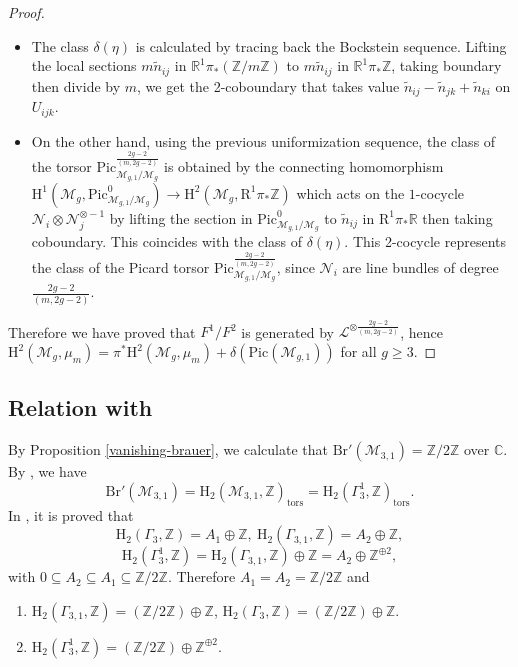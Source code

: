 \documentclass[12pt]{amsart}
\begin{document}
\begin{proof}
\begin{itemize}
\item The class $\delta(\eta)$ is calculated by tracing back the Bockstein sequence. Lifting the local sections $m\widetilde{n}_{ij}$ in $\mathbb{R}^1\pi_*(\mathbb{Z}/m\mathbb{Z})$ to $m\widetilde{n}_{ij}$ in $\mathbb{R}^1\pi_*\mathbb{Z}$, taking boundary then divide by $m$, we get the 2-coboundary that takes value $\widetilde{n}_{ij}-\widetilde{n}_{jk}+\widetilde{n}_{ki}$ on $U_{ijk}$.
\item On the other hand, using the previous uniformization sequence, the class of the torsor $\mathrm{Pic}^{\frac{2g-2}{(m,2g-2)}}_{\mathcal{M}_{g,1}/\mathcal{M}_g}$
 is obtained by the connecting homomorphism $\mathrm{H}^1(\mathcal{M}_g,\mathrm{Pic}^0_{\mathcal{M}_{g,1}/\mathcal{M}_g})\to\mathrm{H}^2(\mathcal{M}_g,\mathrm{R}^1\pi_*\mathbb{Z})$ which acts on the $1$-cocycle $\mathcal{N}_{i}\otimes\mathcal{N}_j^{\otimes-1}$ by lifting the section in $\mathrm{Pic}^0_{\mathcal{M}_{g,1}/\mathcal{M}_g}$ to $\widetilde{n}_{ij}$ in $\mathrm{R}^1\pi_*\mathbb{R}$ then taking coboundary. This coincides with the class of $\delta(\eta)$. This 2-cocycle represents the class of the Picard torsor $\mathrm{Pic}^{\frac{2g-2}{(m,2g-2)}}_{\mathcal{M}_{g,1}/\mathcal{M}_g}$, since $\mathcal{N}_i$ are line bundles of degree $\frac{2g-2}{(m,2g-2)}$.
\end{itemize}
Therefore we have proved that $F^1/F^2$ is generated by $\mathcal{L}^{\otimes\frac{2g-2}{(m,2g-2)}}$, hence $\mathrm{H}^2(\mathcal{M}_g,\mu_m)=\pi^*\mathrm{H}^2(\mathcal{M}_{g},\mu_m)+\delta(\mathrm{Pic}(\mathcal{M}_{g,1}))$ for all $g\geq3$.
\end{proof}


\subsection{Relation with \cite[Theorem 1.2]{zbMATH01991000}}
By Proposition \ref{vanishing-brauer}, we calculate that $\mathrm{Br}'(\mathcal{M}_{3,1})=\mathbb{Z}/2\mathbb{Z}$ over $\mathbb{C}$. By \cite[Proposition 4.1]{zbMATH07456405}, we have $$\mathrm{Br}'(\mathcal{M}_{3,1})=\mathrm{H}_2(\mathcal{M}_{3,1},\mathbb{Z})_{\mathrm{tors}}=\mathrm{H}_2(\Gamma_3^1,\mathbb{Z})_{\textrm{tors}}.$$ In \cite[Theorem 1.2, Proposition 1.4]{zbMATH01991000}, it is proved that $$\mathrm{H}_2(\Gamma_3,\mathbb{Z})=A_1\oplus\mathbb{Z},\ \mathrm{H}_2(\Gamma_{3,1},\mathbb{Z})=A_2\oplus\mathbb{Z},$$ $$\mathrm{H}_2(\Gamma_3^1,\mathbb{Z})=\mathrm{H}_2(\Gamma_{3,1},\mathbb{Z})\oplus\mathbb{Z}=A_2\oplus\mathbb{Z}^{\oplus2},$$ with $0\subseteq A_2\subseteq A_1\subseteq \mathbb{Z}/2\mathbb{Z}$. Therefore $A_1=A_2=\mathbb{Z}/2\mathbb{Z}$ and \begin{enumerate}
\item $\mathrm{H}_2(\Gamma_{3,1},\mathbb{Z})=(\mathbb{Z}/2\mathbb{Z})\oplus \mathbb{Z}$, $\mathrm{H}_2(\Gamma_3,\mathbb{Z})=( \mathbb{Z}/2\mathbb{Z})\oplus \mathbb{Z}$. \item $\mathrm{H}_2(\Gamma_3^1,\mathbb{Z})=(\mathbb{Z}/2\mathbb{Z})\oplus\mathbb{Z}^{\oplus2}.$
\end{enumerate}
\end{document}
